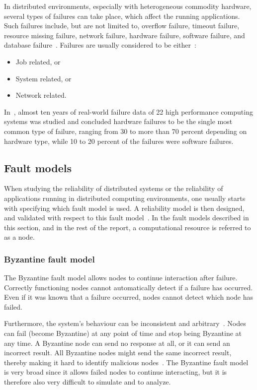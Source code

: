 \documentclass{cslthse-msc}
\begin{document}
In distributed environments, especially with heterogeneous commodity hardware, several types of failures can take place, which affect the running applications. Such failures include, but are not limited to, overflow failure, timeout failure, resource missing failure, network failure, hardware failure, software failure, and database failure~\cite{cloudServiceRel}. Failures are usually considered to be either~\cite{evalOfGridRel}:

\begin{itemize}
	\item Job related, or
	\item System related, or
	\item Network related.
\end{itemize}

In~\cite{studyOfFailures}, almost ten years of real-world failure data of 22 high performance computing systems was studied and concluded hardware failures to be the single most common type of failure, ranging from 30 to more than 70 percent depending on hardware type, while 10 to 20 percent of the failures were software failures.

\subsection{Fault models} \label{subsec:background_fault_models}
When studying the reliability of distributed systems or the reliability of applications running in distributed computing environments, one usually starts with specifying which fault model is used. A reliability model is then designed, and validated with respect to this fault model~\cite{faultTolerantFundamentals}. In the fault models described in this section, and in the rest of the report, a computational resource is referred to as a node.

\subsubsection{Byzantine fault model} \label{subsub:background_byzantine}
The Byzantine fault model allows nodes to continue interaction after failure. Correctly functioning nodes cannot automatically detect if a failure has occurred. Even if it was known that a failure occurred, nodes cannot detect which node has failed. 

Furthermore, the system's behaviour can be inconsistent and arbitrary~\cite{surveyFaultParallel}. Nodes can fail (become Byzantine) at any point of time and stop being Byzantine at any time. A Byzantine node can send no response at all, or it can send an incorrect result. All Byzantine nodes might send the same incorrect result, thereby making it hard to identify malicious nodes~\cite{selfAdaptRel}. %
The Byzantine fault model is very broad since it allows failed nodes to continue interacting, but it is therefore also very difficult to simulate and to analyze.
\end{document}
